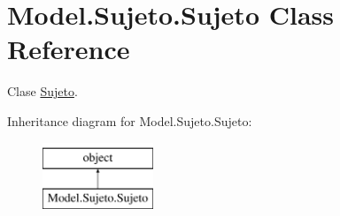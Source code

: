 \hypertarget{class_model_1_1_sujeto_1_1_sujeto}{}\section{Model.\+Sujeto.\+Sujeto Class Reference}
\label{class_model_1_1_sujeto_1_1_sujeto}


Clase \hyperlink{class_model_1_1_sujeto_1_1_sujeto}{Sujeto}.  


Inheritance diagram for Model.\+Sujeto.\+Sujeto\+:\begin{figure}[H]
\begin{center}
\leavevmode
\includegraphics[height=2.000000cm]{class_model_1_1_sujeto_1_1_sujeto}
\end{center}
\end{figure}
